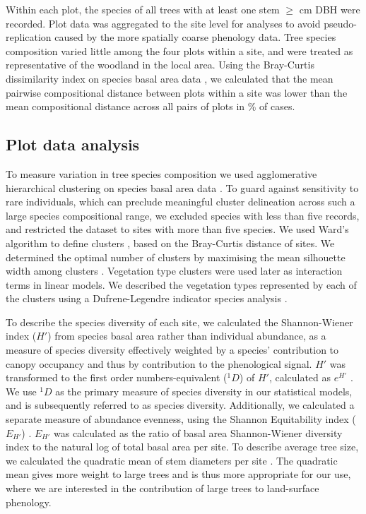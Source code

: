 \documentclass[11pt,a4paper]{article}
\begin{document}
Within each plot, the species of all trees with at least one stem $\geq$\stemSize{} cm DBH were recorded. Plot data was aggregated to the site level for analyses to avoid pseudo-replication caused by the more spatially coarse phenology data. Tree species composition varied little among the four plots within a site, and were treated as representative of the woodland in the local area. Using the Bray-Curtis dissimilarity index on species basal area data \citep{Faith1987}, we calculated that the mean pairwise compositional distance between plots within a site was lower than the mean compositional distance across all pairs of plots in \plotDistPer{}\% of cases.

\subsection{Plot data analysis} 

To measure variation in tree species composition we used agglomerative hierarchical clustering on species basal area data \citep{Kreft2010, Fayolle2014}. To guard against sensitivity to rare individuals, which can preclude meaningful cluster delineation across such a large species compositional range, we excluded species with less than five records, and restricted the dataset to sites with more than five species. We used Ward's algorithm to define clusters \citep{Murtagh2014}, based on the Bray-Curtis distance of sites. We determined the optimal number of clusters by maximising the mean silhouette width among clusters \citep{Rousseeuw1987}. Vegetation type clusters were used later as interaction terms in linear models. We described the vegetation types represented by each of the clusters using a Dufrene-Legendre indicator species analysis \citep{Dufrene1997}.

To describe the species diversity of each site, we calculated the Shannon-Wiener index ($H'$) from species basal area rather than individual abundance, as a measure of species diversity effectively weighted by a species' contribution to canopy occupancy and thus by contribution to the phenological signal. $H'$ was transformed to the first order numbers-equivalent ($^1\!D$) of $H'$, calculated as $e^{H'}$ \citep{Jost2007}. We use $^1\!D$ as the primary measure of species diversity in our statistical models, and is subsequently referred to as species diversity. Additionally, we calculated a separate measure of abundance evenness, using the Shannon Equitability index ($E_{H'}$) \citep{Smith1996}. $E_{H'}$ was calculated as the ratio of basal area Shannon-Wiener diversity index to the natural log of total basal area per site. To describe average tree size, we calculated the quadratic mean of stem diameters per site \citep{Curtis2000}. The quadratic mean gives more weight to large trees and is thus more appropriate for our use, where we are interested in the contribution of large trees to land-surface phenology. 
\end{document}
